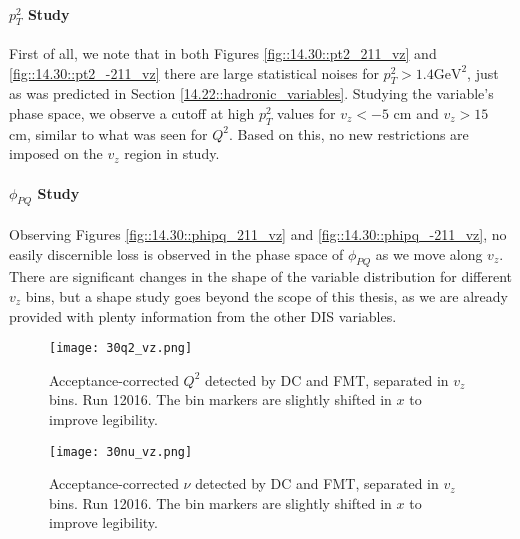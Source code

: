     \paragraph{$p_T^2$ Study}
        First of all, we note that in both Figures \ref{fig::14.30::pt2_211_vz} and \ref{fig::14.30::pt2_-211_vz} there are large statistical noises for $p_T^2 > 1.4 \text{GeV}^2$, just as was predicted in Section \ref{14.22::hadronic_variables}.
        Studying the variable's phase space, we observe a cutoff at high $p_T^2$ values for $v_z < -5$ cm and $v_z > 15$ cm, similar to what was seen for $Q^2$.
        Based on this, no new restrictions are imposed on the $v_z$ region in study.

    \paragraph{$\phi_{PQ}$ Study}
        Observing Figures \ref{fig::14.30::phipq_211_vz} and \ref{fig::14.30::phipq_-211_vz}, no easily discernible loss is observed in the phase space of $\phi_{PQ}$ as we move along $v_z$.
        There are significant changes in the shape of the variable distribution for different $v_z$ bins, but a shape study goes beyond the scope of this thesis, as we are already provided with plenty information from the other DIS variables.


    \begin{figure}
        \centering
        \texttt{[image: 30q2\_vz.png]}
        \caption[Acceptance-corrected $Q^2$ separated in $v_z$ bins, run 12016]
        {Acceptance-corrected $Q^2$ detected by DC and FMT, separated in $v_z$ bins.
        Run 12016.
        The bin markers are slightly shifted in $x$ to improve legibility.}
        \label{fig::14.30::q2_vz}
    \end{figure}

    \begin{figure}
        \centering
        \texttt{[image: 30nu\_vz.png]}
        \caption[Acceptance-corrected $\nu$ separated in $v_z$ bins, run 12016]
        {Acceptance-corrected $\nu$ detected by DC and FMT, separated in $v_z$ bins.
        Run 12016.
        The bin markers are slightly shifted in $x$ to improve legibility.}
        \label{fig::14.30::nu_vz}
    \end{figure}

